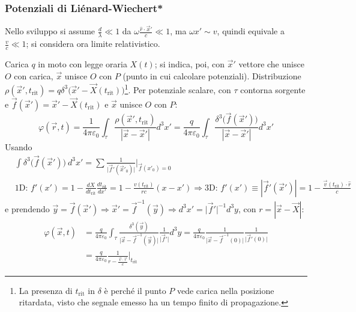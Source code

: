 \documentclass[a4paper]{scrartcl}
\numberwithin{equation}{subsection}
\theoremstyle{style1}
\begin{document}
\subsubsection{Potenziali di Li\'enard-Wiechert*}
Nello sviluppo si assume $\frac{d}{\lambda }\ll 1 $ da $\omega\frac{\hat{r}\cdot \vec{x}'}{c}\ll 1$, ma $\omega x' \sim v$, quindi equivale a $\frac{v}{c}\ll 1$; si considera ora limite relativistico.

Carica $q$ in moto con legge oraria $X(t)$; si indica, poi, con $\vec{x}'$ vettore che unisce $O$ con carica, $\vec{x}$ unisce $O$ con $P$ (punto in cui calcolare potenziali). Distribuzione $\rho (\vec{x}', t_\text{rit}) = q\delta ^3 \big(\vec{x}' - \vec{X}(t_{\text{rit}}) \big)$\footnote{La presenza di $t_\text{rit}$ in $\delta $ è perch\'e il punto $P$ vede carica nella posizione ritardata, visto che segnale emesso ha un tempo finito di propagazione.}. Per potenziale scalare, con $\tau $ contorna sorgente e $\vec{f}(\vec{x}') = \vec{x}' - \vec{X}(t_\text{rit})$ e $\vec{x}$ unisce $O$ con $P$:
\[
\varphi (\vec{r},t) = \frac{1}{4\pi \varepsilon _0} \int_\tau \frac{\rho (\vec{x}', t_\text{rit})}{\left\lvert \vec{x}-\vec{x}' \right\rvert }d^3 x' = \frac{q}{4\pi \varepsilon _0}\int_{\tau } \frac{\delta ^3 \big(\vec{f}(\vec{x}')\big)}{\left\lvert \vec{x}-\vec{x}' \right\rvert } d^3 x'
\] 
Usando
\[
\begin{split}
	&\int \delta ^3 \big(\vec{f}(\vec{x}')\big) \ d^3 x' = \sum_{}^{} \frac{1}{\lvert \vec{f}' (\vec{x}'_0)\rvert }\Bigg|_{\vec{f}(x'_0) = 0} \\
	&\text{1D: } f'(x') = 1-\frac{d X}{d t_\text{rit}} \frac{d t_\text{rit}}{d x'} = 1-\frac{v(t_\text{rit})}{rc}(x-x')\Rightarrow \text{3D: } f'(x')\equiv | \vec{f}'(\vec{x}')| = 1- \frac{\vec{v}(t_\text{rit})\cdot \hat{r}}{c}
\end{split}
\] 
e prendendo $\vec{y}=\vec{f}(\vec{x}')\Rightarrow \vec{x}' = \vec{f}^{-1} (\vec{y})\Rightarrow d^3 x' = \lvert \vec{f}' \rvert ^{-1}d^3y $, con $r = |\vec{x}-\vec{X}|$:
\begin{equation}
	\begin{split}
		\varphi (\vec{x},t) &= \frac{q}{4\pi \varepsilon _0} \int_{\tau } \frac{\delta ^3(\vec{y})}{\lvert \vec{x}-\vec{f}^{-1} (\vec{y}) \rvert } \frac{1}{\lvert \vec{f}' \rvert }d^3y = \frac{q}{4\pi \varepsilon _0} \frac{1}{ \lvert\vec{x}- \vec{f}^{-1} (0) \rvert} \frac{1}{\lvert\vec{f}'(0)\rvert}\\
				    &=\frac{q}{4\pi \varepsilon _0}\frac{1}{r- \frac{\vec{v}\cdot \vec{r}}{c}}\Bigg|_{t_\text{rit}} 
	\end{split}
\end{equation}
\end{document}
